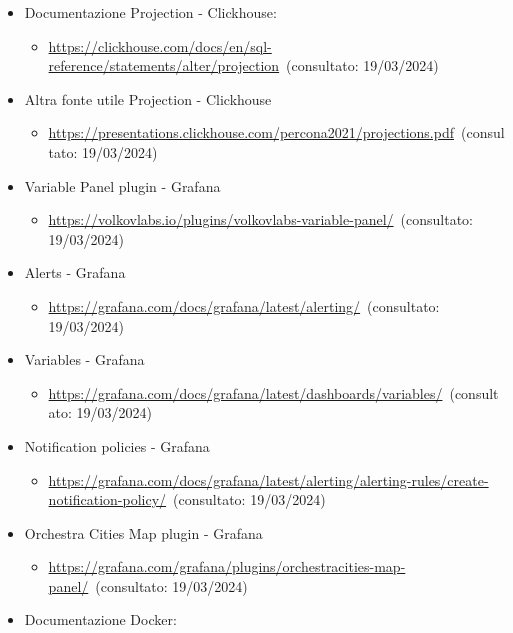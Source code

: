 \begin{itemize}
\begin{itemize}
    \end{itemize}
    \item Documentazione Projection - Clickhouse: 
    \begin{itemize}
        \item \url{https://clickhouse.com/docs/en/sql-reference/statements/alter/projection}~(consultato: 19/03/2024)
    \end{itemize}
    \item Altra fonte utile Projection - Clickhouse 
    \begin{itemize}
        \item \url{https://presentations.clickhouse.com/percona2021/projections.pdf}~(consultato: 19/03/2024)
    \end{itemize}
    \item  Variable Panel plugin - Grafana 
    \begin{itemize}
        \item \url{https://volkovlabs.io/plugins/volkovlabs-variable-panel/}~(consultato: 19/03/2024)
    \end{itemize}
    \item  Alerts - Grafana 
    \begin{itemize}
        \item \url{https://grafana.com/docs/grafana/latest/alerting/}~(consultato: 19/03/2024)
    \end{itemize}
    \item Variables - Grafana 
    \begin{itemize}
        \item \url{https://grafana.com/docs/grafana/latest/dashboards/variables/}~(consultato: 19/03/2024)
    \end{itemize}
    \item  Notification policies - Grafana 
    \begin{itemize}
        \item \url{https://grafana.com/docs/grafana/latest/alerting/alerting-rules/create-notification-policy/}~(consultato: 19/03/2024)
    \end{itemize}
    \item  Orchestra Cities Map plugin - Grafana 
    \begin{itemize}
        \item \url{https://grafana.com/grafana/plugins/orchestracities-map-panel/}~(consultato: 19/03/2024)
    \end{itemize}
    \item Documentazione Docker: 
    \begin{itemize}

\end{itemize}
\end{itemize}
